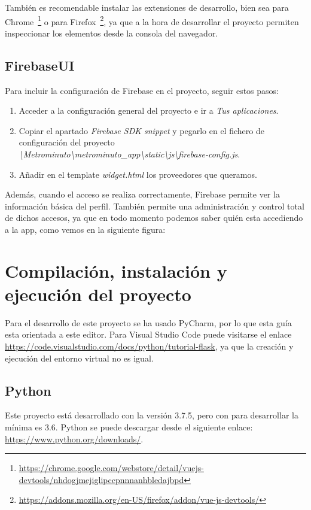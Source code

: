 También es recomendable instalar las extensiones de desarrollo, bien sea para Chrome~\footnote{\url{https://chrome.google.com/webstore/detail/vuejs-devtools/nhdogjmejiglipccpnnnanhbledajbpd}} o para Firefox~\footnote{\url{https://addons.mozilla.org/en-US/firefox/addon/vue-js-devtools/}}, ya que a la hora de desarrollar el proyecto permiten inspeccionar los elementos desde la consola del navegador.

\subsection{FirebaseUI}\label{firebase}
Para incluir la configuración de Firebase en el proyecto, seguir estos pasos:
\begin{enumerate}
	\item Acceder a la configuración general del proyecto e ir a \textit{Tus aplicaciones}.
	\item Copiar el apartado \textit{Firebase SDK snippet} y pegarlo en el fichero de configuración del proyecto \textit{\textbackslash{}Metrominuto\textbackslash{}metrominuto\_app\textbackslash{}static\textbackslash{}js\textbackslash{}firebase-config.js}.
	\item Añadir en el template \textit{widget.html} los proveedores que queramos.
\end{enumerate}

Además, cuando el acceso se realiza correctamente, Firebase permite ver la información básica del perfil. También permite una administración y control total de dichos accesos, ya que en todo momento podemos saber quién esta accediendo a la app, como vemos en la siguiente figura:

\section{Compilación, instalación y ejecución del proyecto}
Para el desarrollo de este proyecto se ha usado PyCharm, por lo que esta guía esta orientada a este editor. Para Visual Studio Code puede visitarse el enlace \url{https://code.visualstudio.com/docs/python/tutorial-flask}, ya que la creación y ejecución del entorno virtual no es igual.

\subsection{Python}
Este proyecto está desarrollado con la versión 3.7.5, pero con para desarrollar la mínima es 3.6. Python se puede descargar desde el siguiente enlace: \url{https://www.python.org/downloads/}.

